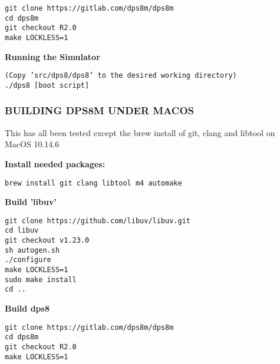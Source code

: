 \begin{adjustwidth}{5ex}{1ex}
    \texttt{git clone https://gitlab.com/dps8m/dps8m} \\
    \texttt{cd dps8m} \\
    \texttt{git checkout R2.0} \\
    \texttt{make LOCKLESS=1} \\
\end{adjustwidth}  

\textbf{Running the Simulator}

\begin{adjustwidth}{5ex}{1ex}
    \texttt{(Copy 'src/dps8/dps8' to the desired working directory)} \\
    \texttt{./dps8 [boot script]} \\
\end{adjustwidth}  

\newpage

\subsubsection[Building dps8m under MacOS]{BUILDING DPS8M UNDER MACOS}

This has all been tested except the brew install of git, clang and libtool on MacOS 10.14.6

\textbf{Install needed packages:}

\begin{adjustwidth}{5ex}{1ex}
	\texttt{brew install git clang libtool m4 automake} \\
\end{adjustwidth}  

\textbf{Build 'libuv'}

\begin{adjustwidth}{5ex}{1ex}
    \texttt{git clone https://github.com/libuv/libuv.git} \\
    \texttt{cd libuv} \\
    \texttt{git checkout v1.23.0} \\
    \texttt{sh autogen.sh} \\
    \texttt{./configure} \\
    \texttt{make LOCKLESS=1} \\
    \texttt{sudo make install} \\
    \texttt{cd ..} \\
\end{adjustwidth}  

\textbf{Build dps8}

\begin{adjustwidth}{5ex}{1ex}
    \texttt{git clone https://gitlab.com/dps8m/dps8m} \\
    \texttt{cd dps8m} \\
    \texttt{git checkout R2.0} \\
    \texttt{make LOCKLESS=1} \\
\end{adjustwidth}  

